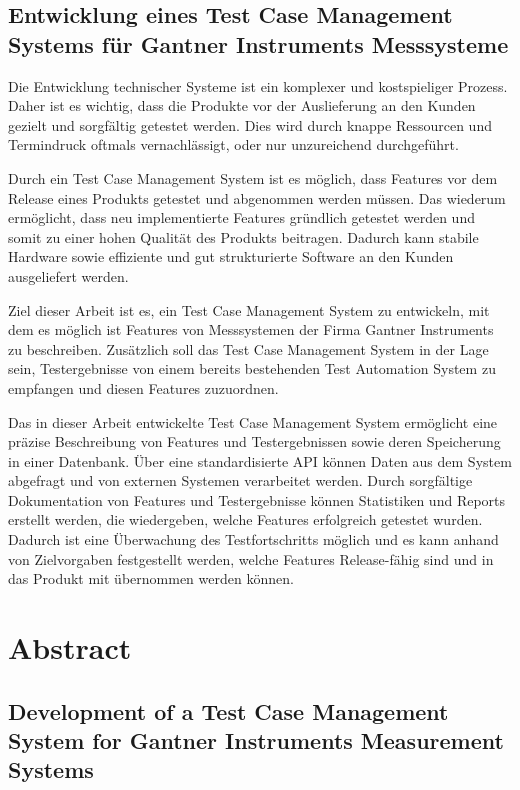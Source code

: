 \documentclass[a4paper, fontsize=11pt, parskip=half, twoside]{scrreprt}
\begin{document}
	\subsection*{Entwicklung eines Test Case Management Systems für Gantner Instruments Messsysteme}
	
	Die Entwicklung technischer Systeme ist ein komplexer und kostspieliger Prozess. 
	Daher ist es wichtig, dass die Produkte vor der Auslieferung an den Kunden gezielt und sorgfältig getestet werden. 
	Dies wird durch knappe Ressourcen und Termindruck oftmals vernachlässigt, oder nur unzureichend durchgeführt. 
	
	Durch ein Test Case Management System ist es möglich, dass Features vor dem Release eines Produkts getestet und abgenommen werden müssen. 
	Das wiederum ermöglicht, dass neu implementierte Features gründlich getestet werden und somit zu einer hohen Qualität des Produkts beitragen.
	Dadurch kann stabile Hardware sowie effiziente und gut strukturierte Software an den Kunden ausgeliefert werden.
	
	Ziel dieser Arbeit ist es, ein Test Case Management System zu entwickeln, mit dem es möglich ist Features von Messsystemen der Firma Gantner Instruments zu beschreiben.
	Zusätzlich soll das Test Case Management System in der Lage sein, Testergebnisse von einem bereits bestehenden Test Automation System zu empfangen und diesen Features zuzuordnen.
	
	Das in dieser Arbeit entwickelte Test Case Management System ermöglicht eine präzise Beschreibung von Features und Testergebnissen sowie deren Speicherung in einer Datenbank. 
	Über eine standardisierte API können Daten aus dem System abgefragt und von externen Systemen verarbeitet werden. 
	Durch sorgfältige Dokumentation von Features und Testergebnisse können Statistiken und Reports erstellt werden, die wiedergeben, welche Features erfolgreich getestet wurden.
	Dadurch ist eine Überwachung des Testfortschritts möglich und es kann anhand von Zielvorgaben festgestellt werden, welche Features Release-fähig sind und in das Produkt mit übernommen werden können.
	
	\newpage
	\section*{Abstract}
	\subsection*{Development of a Test Case Management System for Gantner Instruments Measurement Systems}
	
\end{document}
